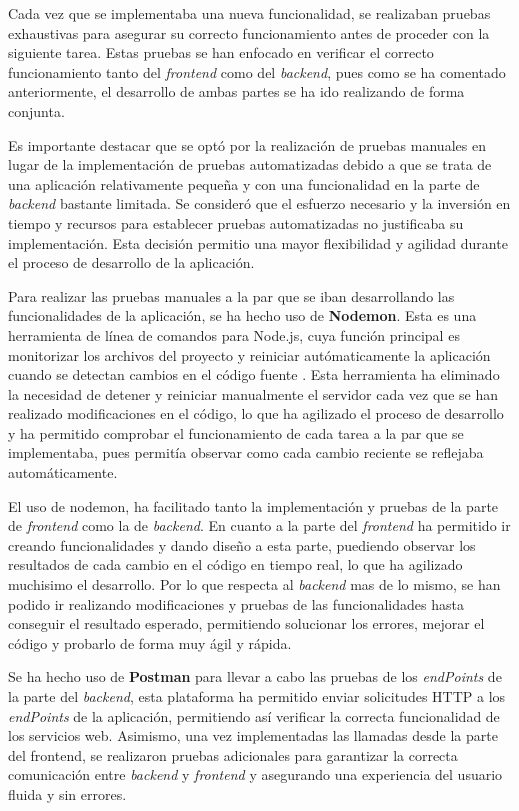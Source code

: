 \documentclass[12pt]{article}
\begin{document}
Cada vez que se implementaba una nueva funcionalidad, se realizaban pruebas exhaustivas para asegurar su correcto funcionamiento antes de proceder con la 
siguiente tarea. Estas pruebas se han enfocado en verificar el correcto funcionamiento tanto del \textit{frontend} como del \textit{backend}, pues como se ha comentado anteriormente, 
el desarrollo de ambas partes se ha ido realizando de forma conjunta.

Es importante destacar que se optó por la realización de pruebas manuales en lugar de la implementación de pruebas automatizadas debido a que se 
trata de una aplicación relativamente pequeña y con una funcionalidad en la parte de \textit{backend} bastante limitada. Se consideró que el esfuerzo necesario y la inversión
en tiempo y recursos para establecer pruebas automatizadas no justificaba su implementación. Esta decisión permitio una mayor flexibilidad y agilidad durante
el proceso de desarrollo de la aplicación.

Para realizar las pruebas manuales a la par que se iban desarrollando las funcionalidades de la aplicación, se ha hecho uso de \textbf{Nodemon}. 
Esta es una herramienta de línea de comandos para Node.js, cuya función principal es monitorizar los archivos del proyecto y reiniciar autómaticamente
la aplicación cuando se detectan cambios en el código fuente \cite{nodemon}. 
Esta herramienta ha eliminado la necesidad de detener y reiniciar manualmente el servidor cada vez que se han realizado modificaciones en el código, 
lo que ha agilizado el proceso de desarrollo y ha permitido comprobar el funcionamiento de cada tarea a la par que se implementaba, pues permitía observar como
cada cambio reciente se reflejaba automáticamente.

El uso de nodemon, ha facilitado tanto la implementación y pruebas de la parte de \textit{frontend} como la de \textit{backend}. En cuanto a la parte del \textit{frontend}
ha permitido ir creando funcionalidades y dando diseño a esta parte, puediendo observar los resultados de cada cambio en el código en tiempo real,
lo que ha agilizado muchisimo el desarrollo. Por lo que respecta al \textit{backend} mas de lo mismo, se han podido ir realizando modificaciones y pruebas de las funcionalidades
hasta conseguir el resultado esperado, permitiendo solucionar los errores, mejorar el código y probarlo de forma muy ágil y rápida. 

Se ha hecho uso de \textbf{Postman} para llevar a cabo las pruebas de los \textit{endPoints} de la parte del \textit{backend}, esta plataforma ha permitido enviar 
solicitudes HTTP a los \textit{endPoints} de la aplicación, permitiendo así verificar la correcta funcionalidad de los servicios web. Asimismo, una vez implementadas
las llamadas desde la parte del frontend, se realizaron pruebas adicionales para garantizar la correcta comunicación entre \textit{backend} y \textit{frontend} y asegurando una
experiencia del usuario fluida y sin errores.
\end{document}
